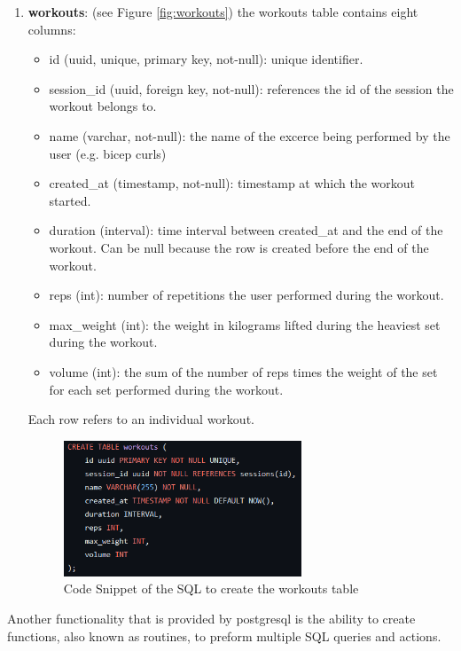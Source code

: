 \begin{enumerate}
                \item \textbf{workouts}:  (see Figure \ref{fig:workouts}) the workouts table contains eight columns:
                    \begin{itemize}
                        \item id (uuid, unique, primary key, not-null): unique identifier.
                        \item session\_id (uuid, foreign key, not-null): references the id of the session the workout belongs to.
                        \item name (varchar, not-null): the name of the excerce being performed by the user (e.g. bicep curls)
                        \item created\_at (timestamp, not-null): timestamp at which the workout started.
                        \item duration (interval): time interval between created\_at and the end of the workout. Can be null because the row is created before the end of the workout.
                        \item reps (int): number of repetitions the user performed during the workout.
                        \item max\_weight (int): the weight in kilograms lifted during the heaviest set during the workout.
                        \item volume (int): the sum of the number of reps times the weight of the set for each set performed during the workout.
                    \end{itemize}
                    Each row refers to an individual workout.
                    \begin{figure}[htbp]
                            \centering
                            \includegraphics[width=0.67\textwidth]{figures/workouts.png}
                            \caption{Code Snippet of the SQL to create the workouts table}
                            \label{fig:users}
                    \end{figure}
                
            \end{enumerate}
            Another functionality that is provided by postgresql is the ability to create functions, also known as routines, to preform multiple SQL queries and actions.\\


